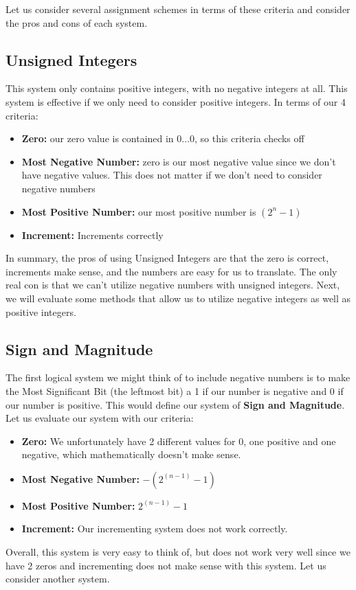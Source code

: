 \documentclass[letterpaper]{article}
\theoremstyle{remark}
\begin{document}
Let us consider several assignment schemes in terms of these criteria and consider the pros and cons of each system.

\subsection{Unsigned Integers}
This system only contains positive integers, with no negative integers at all. This system is effective if we only need to consider positive integers. In terms of our 4 criteria:
\begin{itemize}
    \item \textbf{Zero:} our zero value is contained in 0...0, so this criteria checks off
    \item \textbf{Most Negative Number:} zero is our most negative value since we don't have negative values. This does not matter if we don't need to consider negative numbers
    \item \textbf{Most Positive Number:} our most positive number is $(2^n - 1)$
    \item \textbf{Increment:} Increments correctly
\end{itemize}
In summary, the pros of using Unsigned Integers are that the zero is correct, increments make sense, and the numbers are easy for us to translate. The only real con is that we can't utilize negative numbers with unsigned integers. Next, we will evaluate some methods that allow us to utilize negative integers as well as positive integers.

\subsection{Sign and Magnitude}
The first logical system we might think of to include negative numbers is to make the Most Significant Bit (the leftmost bit) a 1 if our number is negative and 0 if our number is positive. This would define our system of \textbf{Sign and Magnitude}. Let us evaluate our system with our criteria:
\begin{itemize}
    \item \textbf{Zero:} We unfortunately have 2 different values for 0, one positive and one negative, which mathematically doesn't make sense.
    \item \textbf{Most Negative Number:} $-(2^(n-1) - 1)$
    \item \textbf{Most Positive Number:} $2^(n-1) - 1$
    \item \textbf{Increment:} Our incrementing system does not work correctly.
\end{itemize}
Overall, this system is very easy to think of, but does not work very well since we have 2 zeros and incrementing does not make sense with this system. Let us consider another system.
\end{document}
